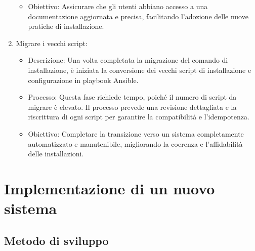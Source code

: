 \begin{enumerate}
\begin{itemize}
      \item Obiettivo: Assicurare che gli utenti abbiano accesso a una
        documentazione aggiornata e precisa, facilitando l'adozione delle nuove pratiche
        di installazione.
    \end{itemize}

  \item Migrare i vecchi script:
    \begin{itemize}
      \item Descrizione: Una volta completata la migrazione del comando di
        installazione, è iniziata la conversione dei vecchi script di installazione
        e configurazione in playbook Ansible.

      \item Processo: Questa fase richiede tempo, poiché il numero di script da migrare
        è elevato. Il processo prevede una revisione dettagliata e la
        riscrittura di ogni script per garantire la compatibilità e l'idempotenza.

      \item Obiettivo: Completare la transizione verso un sistema completamente
        automatizzato e manutenibile, migliorando la coerenza e l'affidabilità delle
        installazioni.
    \end{itemize}
\end{enumerate}

\section{Implementazione di un nuovo sistema}
\label{sec:nuovo_sistema}

\subsection{Metodo di sviluppo}
\label{sub:sviluppo}

